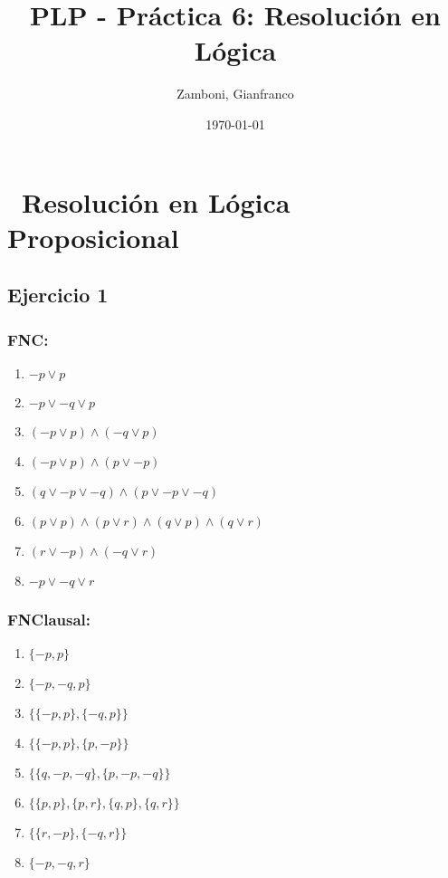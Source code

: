 \documentclass[10pt,a4paper]{article}
\begin{document}
  \title{PLP - Práctica 6: Resolución en Lógica}

  \date{\today}

  \author{Zamboni, Gianfranco}

  \maketitle
  \setcounter{page}{1}


\section*{\ Resolución en Lógica Proposicional}
\subsection{Ejercicio 1}
    \subsubsection{FNC:}
    \begin{enumerate}
    \item $-p \vee p$
    \item $-p \vee -q \vee p$
    \item $(-p \vee p) \wedge (-q \vee p)$
    \item $(-p \vee p) \wedge (p \vee -p)$
    \item $(q \vee -p \vee -q) \wedge (p \vee -p \vee -q)$
    \item $(p \vee p) \wedge (p \vee r) \wedge (q \vee p) \wedge (q \vee r)$
    \item $(r \vee -p) \wedge (-q \vee r)$
    \item $-p \vee -q \vee r$
    \end{enumerate}
    \subsubsection{FNClausal:}
    \begin{enumerate}
    \item $\{-p, p\}$
    \item $\{-p, -q, p\}$
    \item $\{\{-p, p\},\{-q, p\}\}$
    \item $\{\{-p, p\}, \{p, -p\}\}$
    \item $\{\{q, -p, -q\}, \{p, -p, -q\}\}$
    \item $\{\{p, p\}, \{p, r\}, \{q, p\}, \{q, r\}\}$
    \item $\{\{r, -p\}, \{-q, r\}\}$
    \item $\{-p, -q, r\}$
    \end{enumerate}
\end{document}
